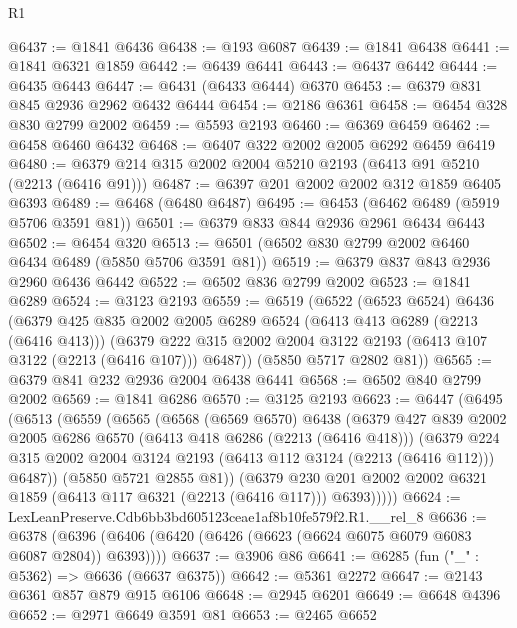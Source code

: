 \begin{lexlean}{R1}
\begin{coremodule}
@6437 := @1841 @6436
@6438 := @193 @6087
@6439 := @1841 @6438
@6441 := @1841 @6321 @1859
@6442 := @6439 @6441
@6443 := @6437 @6442
@6444 := @6435 @6443
@6447 := @6431 (@6433 @6444) @6370
@6453 := @6379 @831 @845 @2936 @2962 @6432 @6444
@6454 := @2186 @6361
@6458 := @6454 @328 @830 @2799 @2002
@6459 := @5593 @2193
@6460 := @6369 @6459
@6462 := @6458 @6460 @6432
@6468 := @6407 @322 @2002 @2005 @6292 @6459 @6419
@6480 := @6379 @214 @315 @2002 @2004 @5210 @2193 (@6413 @91 @5210 (@2213 (@6416 @91)))
@6487 := @6397 @201 @2002 @2002 @312 @1859 @6405 @6393
@6489 := @6468 (@6480 @6487)
@6495 := @6453 (@6462 @6489 (@5919 @5706 @3591 @81))
@6501 := @6379 @833 @844 @2936 @2961 @6434 @6443
@6502 := @6454 @320
@6513 := @6501 (@6502 @830 @2799 @2002 @6460 @6434 @6489 (@5850 @5706 @3591 @81))
@6519 := @6379 @837 @843 @2936 @2960 @6436 @6442
@6522 := @6502 @836 @2799 @2002
@6523 := @1841 @6289
@6524 := @3123 @2193
@6559 := @6519
    (@6522
      (@6523 @6524)
      @6436
      (@6379
        @425
        @835
        @2002
        @2005
        @6289
        @6524
        (@6413 @413 @6289 (@2213 (@6416 @413)))
        (@6379 @222 @315 @2002 @2004 @3122 @2193 (@6413 @107 @3122 (@2213 (@6416 @107))) @6487))
      (@5850 @5717 @2802 @81))
@6565 := @6379 @841 @232 @2936 @2004 @6438 @6441
@6568 := @6502 @840 @2799 @2002
@6569 := @1841 @6286
@6570 := @3125 @2193
@6623 := @6447
    (@6495
      (@6513
        (@6559
          (@6565
            (@6568
              (@6569 @6570)
              @6438
              (@6379
                @427
                @839
                @2002
                @2005
                @6286
                @6570
                (@6413 @418 @6286 (@2213 (@6416 @418)))
                (@6379
                  @224
                  @315
                  @2002
                  @2004
                  @3124
                  @2193
                  (@6413 @112 @3124 (@2213 (@6416 @112)))
                  @6487))
              (@5850 @5721 @2855 @81))
            (@6379
              @230
              @201
              @2002
              @2002
              @6321
              @1859
              (@6413 @117 @6321 (@2213 (@6416 @117)))
              @6393)))))
@6624 := LexLeanPreserve.Cdb6bb3bd605123ceae1af8b10fe579f2.R1.__rel_8
@6636 := @6378 (@6396 (@6406 (@6420 (@6426 (@6623 (@6624 @6075 @6079 @6083 @6087 @2804)) @6393))))
@6637 := @3906 @86
@6641 := @6285 (fun ("_" : @5362) => @6636 (@6637 @6375))
@6642 := @5361 @2272
@6647 := @2143 @6361 @857 @879 @915 @6106
@6648 := @2945 @6201
@6649 := @6648 @4396
@6652 := @2971 @6649 @3591 @81
@6653 := @2465 @6652

\end{coremodule}
\end{lexlean}
